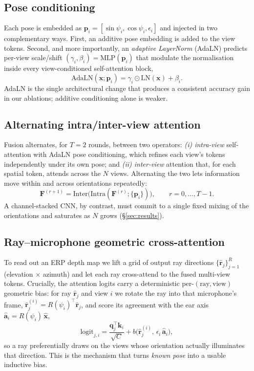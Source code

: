 \subsection{Pose conditioning}
Each pose is embedded as $\mathbf{p}_i=[\sin\psi_i,\cos\psi_i,\epsilon_i]$ and injected
in two complementary ways. First, an additive pose embedding is added to the view
tokens. Second, and more importantly, an \emph{adaptive LayerNorm} (AdaLN) predicts
per-view scale/shift $(\gamma_i,\beta_i)=\mathrm{MLP}(\mathbf{p}_i)$ that modulate the
normalisation inside every view-conditioned self-attention block,
\begin{equation}
\mathrm{AdaLN}(\mathbf{x};\mathbf{p}_i)=\gamma_i\odot\mathrm{LN}(\mathbf{x})+\beta_i .
\end{equation}
AdaLN is the single architectural change that produces a consistent accuracy gain in
our ablations; additive conditioning alone is weaker.

\subsection{Alternating intra/inter-view attention}
Fusion alternates, for $T{=}2$ rounds, between two operators:
\emph{(i) intra-view} self-attention with AdaLN pose conditioning, which refines each
view's tokens independently under its own pose; and \emph{(ii) inter-view} attention
that, for each spatial token, attends across the $N$ views. Alternating the two lets
information move within and across orientations repeatedly:
\begin{equation}
\mathbf{F}^{(r+1)} = \mathrm{Inter}\!\big(\mathrm{Intra}(\mathbf{F}^{(r)};\{\mathbf{p}_i\})\big),
\qquad r=0,\dots,T{-}1 .
\end{equation}
A channel-stacked CNN, by contrast, must commit to a single fixed mixing of the
orientations and saturates as $N$ grows (\S\ref{sec:results}).

\subsection{Ray--microphone geometric cross-attention}
To read out an ERP depth map we lift a grid of output ray directions
$\{\hat{\mathbf{r}}_j\}_{j=1}^{R}$ (elevation $\times$ azimuth) and let each ray
cross-attend to the fused multi-view tokens. Crucially, the attention logits carry a
deterministic per-$(\text{ray},\text{view})$ geometric bias: for ray $\hat{\mathbf{r}}_j$
and view $i$ we rotate the ray into that microphone's frame,
$\hat{\mathbf{r}}_j^{(i)}=R(\psi_i)^{\!\top}\hat{\mathbf{r}}_j$, and score its agreement
with the ear axis $\hat{\mathbf{a}}_i=R(\psi_i)\,\hat{\mathbf{x}}$,
\begin{equation}
\mathrm{logit}_{j,i} = \frac{\mathbf{q}_j^{\!\top}\mathbf{k}_i}{\sqrt{C}}
      + b\big(\hat{\mathbf{r}}_j^{(i)},\,\epsilon_i\,\hat{\mathbf{a}}_i\big),
\end{equation}
so a ray preferentially draws on the views whose orientation actually illuminates
that direction. This is the mechanism that turns \emph{known pose} into a usable
inductive bias.

